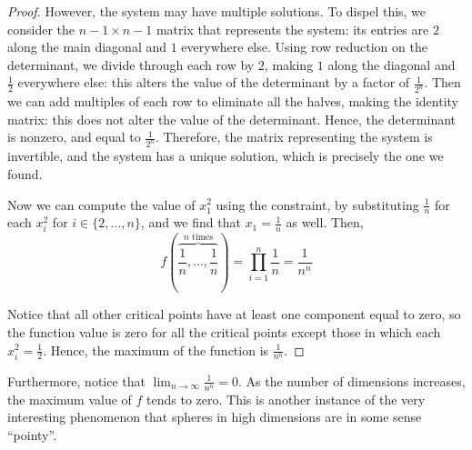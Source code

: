 \documentclass[letterpaper,11pt]{article}
\newcommand{\parens}[1]{\left(#1\right)}
\begin{document}
\begin{proof}
  However, the system may have multiple solutions. To dispel this, we consider
  the $n-1 \times n-1$ matrix that represents the system: its entries are $2$
  along the main diagonal and $1$ everywhere else. Using row reduction on the
  determinant, we divide through each row by $2$, making $1$ along the diagonal
  and $\frac{1}{2}$ everywhere else: this alters the value of the determinant
  by a factor of $\frac{1}{2^n}$. Then we can add multiples of each row to
  eliminate all the halves, making the identity matrix: this does not alter the
  value of the determinant. Hence, the determinant is nonzero, and equal to
  $\frac{1}{2^n}$. Therefore, the matrix representing the system is invertible,
  and the system has a unique solution, which is precisely the one we found.

  Now we can compute the value of $x_1^2$ using the constraint, by substituting
  $\frac{1}{n}$ for each $x_i^2$ for $i \in \{2, \ldots, n\}$, and we find that
  $x_1 = \frac{1}{n}$ as well.
  Then,
  \begin{equation*}
    f\parens{\overbrace{\frac{1}{n}, \ldots, \frac{1}{n}}^\text{$n$ times}}
    = \prod_{i=1}^n \frac{1}{n} = \frac{1}{n^n}
  \end{equation*}

  Notice that all other critical points have at least one component equal to
  zero, so the function value is zero for all the critical points except those
  in which each $x_i^2 = \frac{1}{2}$. Hence, the maximum of the function is
  $\frac{1}{n^n}$.
\end{proof}

Furthermore, notice that $\lim_{n\to\infty} \frac{1}{n^n} = 0$. As the number
of dimensions increases, the maximum value of $f$ tends to zero. This is
another instance of the very interesting phenomenon that spheres in high
dimensions are in some sense ``pointy''.
\end{document}
